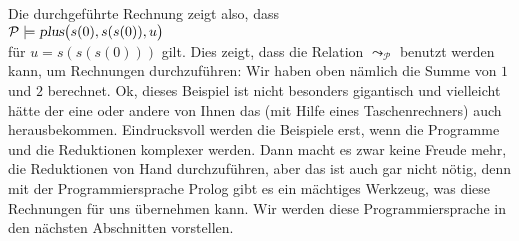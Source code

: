 Die durchgef\"{u}hrte  Rechnung zeigt also, dass \\[0.1cm]
\hspace*{1.3cm} $\mathcal{P} \models \textsl{plus}\big(s(0), s(s(0)), u\big)$ \\[0.1cm]
f\"{u}r $u = s(s(s(0)))$ gilt.   Dies zeigt, dass die Relation $\leadsto_\mathcal{P}$ benutzt
werden kann, um Rechnungen durchzuf\"{u}hren: Wir haben oben n\"{a}mlich die Summe von $1$ und $2$ berechnet.
Ok, dieses Beispiel ist nicht besonders gigantisch und vielleicht h\"{a}tte der eine oder andere von Ihnen das 
(mit Hilfe eines Taschenrechners) auch herausbekommen.
 Eindrucksvoll werden die Beispiele erst, wenn die Programme und 
die Reduktionen komplexer werden.  Dann macht es zwar keine Freude mehr, die Reduktionen von Hand durchzuf\"{u}hren,
aber das ist auch gar nicht n\"{o}tig, denn mit der Programmiersprache Prolog gibt es ein m\"{a}chtiges Werkzeug,
was diese Rechnungen f\"{u}r uns \"{u}bernehmen kann.  Wir werden diese Programmiersprache in den
n\"{a}chsten Abschnitten vorstellen.

